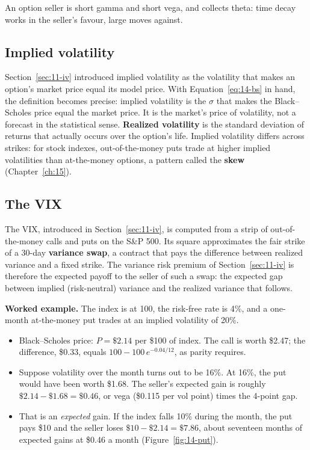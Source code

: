 An option seller is short gamma and short vega, and collects theta: time decay works in the seller's favour, large moves against.

\subsection{Implied volatility}
\label{sec:14-iv}

Section~\ref{sec:11-iv} introduced implied volatility as the volatility that makes an option's market price equal its model price. With Equation~\eqref{eq:14-bs} in hand, the definition becomes precise: implied volatility is the $\sigma$ that makes the Black--Scholes price equal the market price. It is the market's price of volatility, not a forecast in the statistical sense. \textbf{Realized volatility} is the standard deviation of returns that actually occurs over the option's life. Implied volatility differs across strikes: for stock indexes, out-of-the-money puts trade at higher implied volatilities than at-the-money options, a pattern called the \textbf{skew} (Chapter~\ref{ch:15}).

\subsection{The VIX}

The VIX, introduced in Section~\ref{sec:11-iv}, is computed from a strip of out-of-the-money calls and puts on the S\&P 500. Its square approximates the fair strike of a 30-day \textbf{variance swap}, a contract that pays the difference between realized variance and a fixed strike. The variance risk premium of Section~\ref{sec:11-iv} is therefore the expected payoff to the seller of such a swap: the expected gap between implied (risk-neutral) variance and the realized variance that follows.

\textbf{Worked example.} The index is at 100, the risk-free rate is 4\%, and a one-month at-the-money put trades at an implied volatility of 20\%.

\begin{itemize}
  \item Black--Scholes price: $P = \$2.14$ per \$100 of index. The call is worth \$2.47; the difference, \$0.33, equals $100 - 100\,e^{-0.04/12}$, as parity requires.
  \item Suppose volatility over the month turns out to be 16\%. At 16\%, the put would have been worth \$1.68. The seller's expected gain is roughly $\$2.14 - \$1.68 = \$0.46$, or vega (\$0.115 per vol point) times the 4-point gap.
  \item That is an \emph{expected} gain. If the index falls 10\% during the month, the put pays \$10 and the seller loses $\$10 - \$2.14 = \$7.86$, about seventeen months of expected gains at \$0.46 a month (Figure~\ref{fig:14-put}).
\end{itemize}

